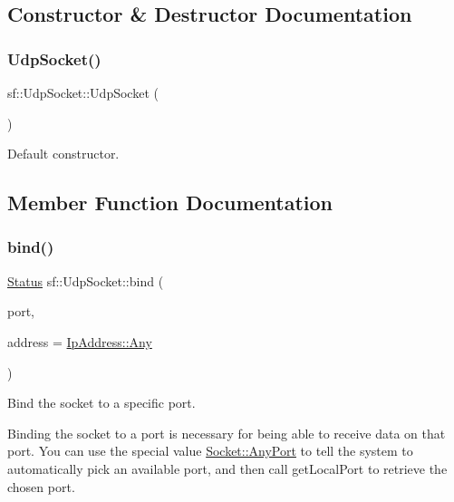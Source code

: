 \subsection{Constructor \& Destructor Documentation}
\mbox{\label{classsf_1_1_udp_socket_abb10725e26dee9d3a8165fe87ffb71bb}} 
\subsubsection{\texorpdfstring{UdpSocket()}{UdpSocket()}}
{\footnotesize\ttfamily sf\+::\+Udp\+Socket\+::\+Udp\+Socket (\begin{DoxyParamCaption}{ }\end{DoxyParamCaption})}



Default constructor. 

\begin{DoxyVerb}\end{DoxyVerb}
 

\subsection{Member Function Documentation}
\mbox{\label{classsf_1_1_udp_socket_ad764c3d06d90b4714dcc97a0d1647bcc}} 
\subsubsection{\texorpdfstring{bind()}{bind()}}
{\footnotesize\ttfamily \mbox{\hyperlink{classsf_1_1_socket_a51bf0fd51057b98a10fbb866246176dc}{Status}} sf\+::\+Udp\+Socket\+::bind (\begin{DoxyParamCaption}\item[{unsigned short}]{port,  }\item[{const \mbox{\hyperlink{classsf_1_1_ip_address}{Ip\+Address}} \&}]{address = {\ttfamily \mbox{\hyperlink{classsf_1_1_ip_address_a3dbc10b0dc6804cc69e29342f7406907}{Ip\+Address\+::\+Any}}} }\end{DoxyParamCaption})}



Bind the socket to a specific port. 

Binding the socket to a port is necessary for being able to receive data on that port. You can use the special value \mbox{\hyperlink{classsf_1_1_socket_aa3e6c984bcb81a35234dcc9cc8369d75a5a3c30fd128895403afc11076f461b19}{Socket\+::\+Any\+Port}} to tell the system to automatically pick an available port, and then call get\+Local\+Port to retrieve the chosen port.

